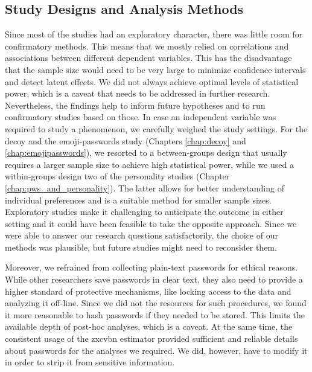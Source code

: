 

\subsection{Study Designs and Analysis Methods}
Since most of the studies had an exploratory character, there was little room for confirmatory methods. This means that we mostly relied on correlations and associations between different dependent variables. This has the disadvantage that the sample size would need to be very large to minimize confidence intervals and detect latent effects. We did not always achieve optimal levels of statistical power, which is a caveat that needs to be addressed in further research. Nevertheless, the findings help to inform future hypotheses and to run confirmatory studies based on those. 
In case an independent variable was required to study a phenomenon, we carefully weighed the study settings. For the decoy and the emoji-passwords study (Chapters \ref{chap:decoy} and \ref{chap:emojipasswords}), we resorted to a between-groups design that usually requires a larger sample size to achieve high statistical power, while we used a within-groups design two of the personality studies (Chapter \ref{chap:pws_and_personality}). The latter allows for better understanding of individual preferences and is a suitable method for smaller sample sizes. Exploratory studies make it challenging to anticipate the outcome in either setting and it could have been feasible to take the opposite approach. Since we were able to answer our research questions satisfactorily, the choice of our methods was plausible, but future studies might need to reconsider them. 

Moreover, we refrained from collecting plain-text passwords for ethical reasons. While other researchers save passwords in clear text, they also need to provide a higher standard of protective mechanisms, like locking access to the data and analyzing it off-line. Since we did not the resources for such procedures, we found it more reasonable to hash passwords if they needed to be stored. This limits the available depth of post-hoc analyses, which is a caveat. At the same time, the consistent usage of the zxcvbn estimator provided sufficient and reliable details about passwords for the analyses we required. We did, however, have to modify it in order to strip it from sensitive information. 

